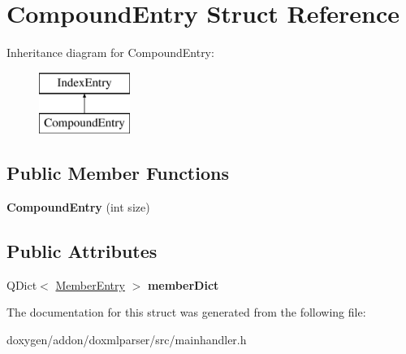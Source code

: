 \hypertarget{struct_compound_entry}{}\section{Compound\+Entry Struct Reference}
\label{struct_compound_entry}
Inheritance diagram for Compound\+Entry\+:\begin{figure}[H]
\begin{center}
\leavevmode
\includegraphics[height=2.000000cm]{struct_compound_entry}
\end{center}
\end{figure}
\subsection*{Public Member Functions}
\begin{DoxyCompactItemize}
\item 
\mbox{\label{struct_compound_entry_a1f000ce2510932333b8ee07551c74d7b}} 
{\bfseries Compound\+Entry} (int size)
\end{DoxyCompactItemize}
\subsection*{Public Attributes}
\begin{DoxyCompactItemize}
\item 
\mbox{\label{struct_compound_entry_a887405905d0ad9d8d2ed65418d1abd96}} 
Q\+Dict$<$ \mbox{\hyperlink{struct_member_entry}{Member\+Entry}} $>$ {\bfseries member\+Dict}
\end{DoxyCompactItemize}


The documentation for this struct was generated from the following file\+:\begin{DoxyCompactItemize}
\item 
doxygen/addon/doxmlparser/src/mainhandler.\+h\end{DoxyCompactItemize}
